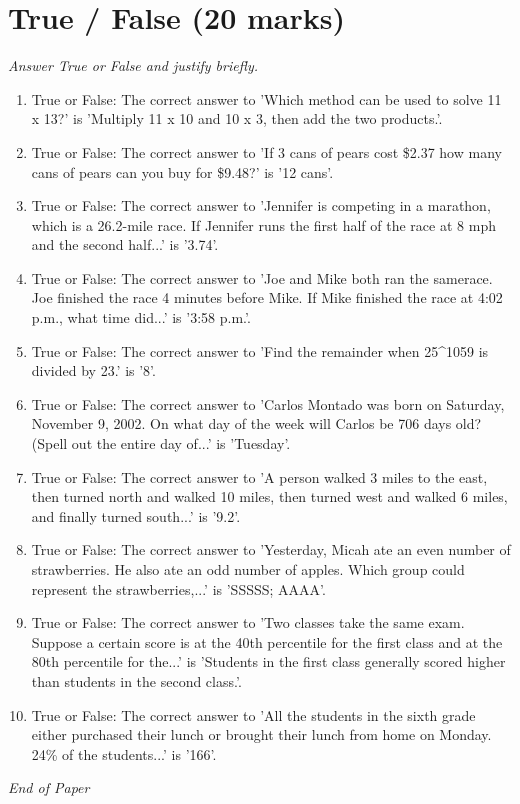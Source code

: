\documentclass[12pt]{article}
\begin{document}
\section*{True / False (20 marks)}
\textit{Answer True or False and justify briefly.}
\begin{enumerate}[label=\arabic*.]
\item True or False: The correct answer to 'Which method can be used to solve 11 x 13?' is 'Multiply 11 x 10 and 10 x 3, then add the two products.'.
\item True or False: The correct answer to 'If 3 cans of pears cost \$2.37 how many cans of pears can you buy for \$9.48?' is '12 cans'.
\item True or False: The correct answer to 'Jennifer is competing in a marathon, which is a 26.2-mile race. If Jennifer runs the first half of the race at 8 mph and the second half...' is '3.74'.
\item True or False: The correct answer to 'Joe and Mike both ran the samerace. Joe finished the race 4 minutes before Mike. If Mike finished the race at 4:02 p.m., what time did...' is '3:58 p.m.'.
\item True or False: The correct answer to 'Find the remainder when 25\^{}1059 is divided by 23.' is '8'.
\item True or False: The correct answer to 'Carlos Montado was born on Saturday, November 9, 2002. On what day of the week will Carlos be 706 days old? (Spell out the entire day of...' is 'Tuesday'.
\item True or False: The correct answer to 'A person walked 3 miles to the east, then turned north and walked 10 miles, then turned west and walked 6 miles, and finally turned south...' is '9.2'.
\item True or False: The correct answer to 'Yesterday, Micah ate an even number of strawberries. He also ate an odd number of apples. Which group could represent the strawberries,...' is 'SSSSS; AAAA'.
\item True or False: The correct answer to 'Two classes take the same exam. Suppose a certain score is at the 40th percentile for the first class and at the 80th percentile for the...' is 'Students in the first class generally scored higher than students in the second class.'.
\item True or False: The correct answer to 'All the students in the sixth grade either purchased their lunch or brought their lunch from home on Monday. 24\% of the students...' is '166'.
\end{enumerate}

\vfill
\noindent\textit{End of Paper}
\end{document}
